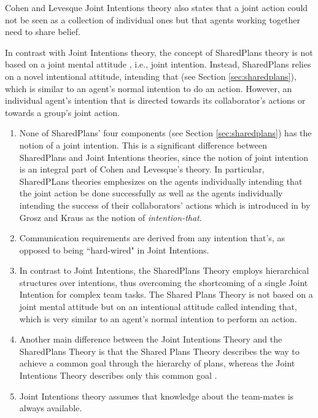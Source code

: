 \documentclass[11pt]{article}
\begin{document}
Cohen and Levesque Joint Intentions theory also states that a joint action could
not be seen as a collection of individual ones but that agents working together
need to share belief.

In contrast with Joint Intentions theory, the concept of SharedPlans theory is
not based on a joint mental attitude , i.e., joint intention. Instead,
SharedPlans relies on a novel intentional attitude, intending that (see
Section \ref{sec:sharedplans}), which is similar to an agent's normal intention
to do an action. However, an individual agent's intention that is directed
towards its collaborator's actions or towards a group's joint action.

\begin{enumerate}
  \item None of SharedPlans' four components (see Section \ref{sec:sharedplans})
  has the notion of a joint intention. This is a significant difference between
  SharedPlans and Joint Intentions theories, since the notion of joint intention
  is an integral part of Cohen and Levesque's theory. In particular, SharedPLans
  theories emphesizes on the agents individually intending that the joint action
  be done successfully as well as the agents individually intending the success
  of their collaborators' actions which is introduced in
  \cite{grosz:collaboration} by Grosz and Kraus as the notion of
  \textit{intention-that}.
  \item Communication requirements are derived from any intention that's, as
  opposed to being ``hard-wired" in Joint Intentions.
  \item In contrast to Joint Intentions, the SharedPlans Theory employs
  hierarchical structures over intentions, thus overcoming the shortcoming of a
  single Joint Intention for complex team tasks. The Shared Plans Theory is not
  based on a joint mental attitude but on an intentional attitude called
  intending that, which is very similar to an agent’s normal intention to
  perform an action.
  \item Another main difference between the Joint Intentions Theory and the
  SharedPlans Theory is that the Shared Plans Theory describes the way to
  achieve a common goal through the hierarchy of plans, whereas the Joint
  Intentions Theory describes only this common goal
  \cite{skubch:modelling-behavior-robots}.
  \item Joint Intentions theory assumes that knowledge about the team-mates is
  always available.
\end{enumerate}
\end{document}
